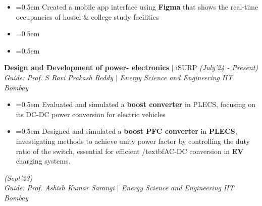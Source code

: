 \documentclass{article}
\begin{document}
\begin{itemize}[label=\textcolor{myblue}{\textbullet},itemsep = -1.25mm, leftmargin=5.5mm]
\item{}\font=0.5em Created a mobile app interface using \textbf{Figma} that shows the real-time occupancies of hostel \& college study facilities
\item{}\font=0.5em 
\item{}\font=0.5em 

\end{itemize}
{\fontsize{12}{12} \textbf{Design and Development of
power- electronics} $|$ iSURP}  \hfill{\sl \small (July'24 - Present)}\\
{\it Guide: Prof. S Ravi Prakash Reddy $|$ Energy Science and Engineering} \hfill{\it IIT Bombay}\hspace{-2pt}
\vspace{-7pt}
\begin{itemize}[label=\textcolor{myblue}{\textbullet},itemsep = -1.25mm, leftmargin=5.5mm]
\item{}\font=0.5em Evaluated and simulated a \textbf{boost converter} in PLECS, focusing on its DC-DC power conversion for electric vehicles
\item{}\font=0.5em Designed and simulated a \textbf{boost PFC converter} in \textbf{PLECS}, investigating methods to achieve unity power factor by controlling the duty ratio of the switch, essential for efficient /textbf{AC-DC} conversion in \textbf{EV} charging systems.
\end{itemize}
  \hfill{\sl \small (Sept’23)}\\
{\it Guide: Prof. Ashish Kumar Sarangi $|$ Energy Science and Engineering} \hfill{\it IIT Bombay}\hspace{-2pt}
 
\end{document}
